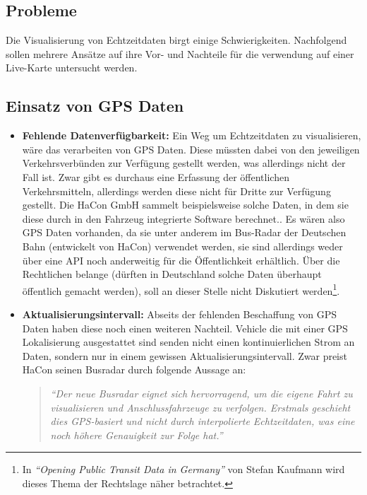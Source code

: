 \begin{newpage}
  
  \section{Probleme}
  \label{sec:probleme}

    Die Visualisierung von Echtzeitdaten birgt einige Schwierigkeiten. Nachfolgend sollen mehrere Ansätze auf ihre Vor- und Nachteile für die verwendung auf einer Live-Karte untersucht werden.

    \subsection{Einsatz von GPS Daten}
    \label{sub:einsatz_von_gps_daten}

      \begin{itemize}
        \item \textbf{Fehlende Datenverfügbarkeit:}
          Ein Weg um Echtzeitdaten zu visualisieren, wäre das verarbeiten von GPS Daten. Diese müssten dabei von den jeweiligen Verkehrsverbünden zur Verfügung gestellt werden, was allerdings nicht der Fall ist. Zwar gibt es durchaus eine Erfassung der öffentlichen Verkehrsmitteln, allerdings werden diese nicht für Dritte zur Verfügung gestellt. Die HaCon GmbH sammelt beispielsweise solche Daten, in dem sie diese durch in den Fahrzeug integrierte Software berechnet.\parencite{havasBusradar}. Es wären also GPS Daten vorhanden, da sie unter anderem im Bus-Radar der Deutschen Bahn (entwickelt von HaCon) verwendet werden, sie sind allerdings weder über eine API noch anderweitig für die Öffentlichkeit erhältlich. Über die Rechtlichen belange (dürften in Deutschland solche Daten überhaupt öffentlich gemacht werden), soll an dieser Stelle nicht Diskutiert werden\footnote{In \textit{"`Opening Public Transit Data in Germany"'} von Stefan Kaufmann\parencite{kaufmann} wird dieses Thema der Rechtslage näher betrachtet.}.

        \item \textbf{Aktualisierungsintervall:}
          Abseits der fehlenden Beschaffung von GPS Daten haben diese noch einen weiteren Nachteil. Vehicle die mit einer GPS Lokalisierung ausgestattet sind senden nicht einen kontinuierlichen Strom an Daten, sondern nur in einem gewissen Aktualisierungsintervall. Zwar preist HaCon seinen Busradar durch folgende Aussage an: 

          \begin{quote}
            \textit{"`Der neue Busradar eignet sich hervorragend, um die eigene Fahrt zu visualisieren und Anschlussfahrzeuge zu verfolgen. Erstmals geschieht dies GPS-basiert und nicht durch interpolierte Echtzeitdaten, was eine noch höhere Genauigkeit zur Folge hat."'}\parencite{havasBusradar}
          \end{quote}


\end{itemize}
\end{newpage}
